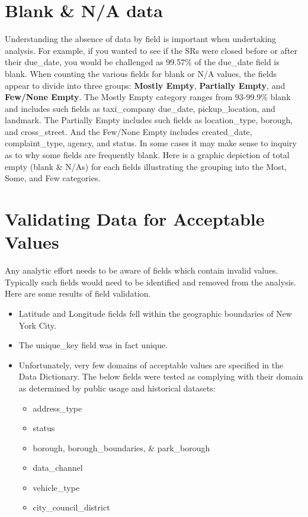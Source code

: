 \documentclass[12pt, titlepage]{article}
\begin{document}
\section{Blank \& N/A data}
\label{sec:blanks}
Understanding the absence of data by field is important 
when undertaking analysis. For example, if you wanted to see if the SRs were
closed before or after their due\_date, you would be challenged 
as 99.57\% of the due\_date field is blank. When counting 
the various fields for blank or N/A values, the fields appear 
to divide into three groups: \textbf{Mostly Empty}, \textbf{Partially Empty}, 
and \textbf{Few/None Empty}. The Mostly Empty category 
ranges from 93-99.9\% blank and includes such fields as 
taxi\_company due\_date, pickup\_location, and 
landmark. The Partially Empty includes such fields as location\_type, borough, 
and cross\_street. And the Few/None Empty includes created\_date, 
complaint\_type, agency, and status. In some cases it may make 
sense to inquiry as to why some fields are frequently blank. Here is a graphic 
depiction of total empty (blank \& N/As) for each fields illustrating
the grouping into the Most, Some, and Few categories. 





 \section{Validating Data for Acceptable Values}
 \label{sec:domain}
Any analytic effort needs to be aware of fields which 
contain invalid values. Typically such fields would need to be
identified and removed from the analysis. Here are some results
of field validation.

\begin{itemize}
	\item Latitude and Longitude fields fell within the geographic 
	boundaries of New York City. 
	
	\item The unique\_key field was in fact unique.
	
	\item Unfortunately, very few domains of acceptable 
	values are specified in the Data Dictionary. The below 
	fields were tested as complying with their domain as 
	determined by public usage and historical datasets:
	\begin{itemize}
		\item address\_type
		\item status
		\item borough, borough\_boundaries, \& park\_borough 
		\item data\_channel
		\item vehicle\_type
		\item city\_council\_district
	\end{itemize}	
\end{itemize}
\end{document}
